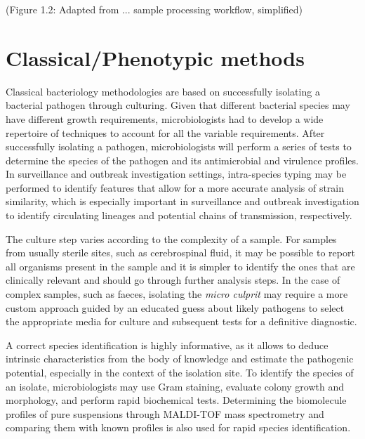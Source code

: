 (Figure 1.2: Adapted from ... sample processing workflow, simplified)

\section{Classical/Phenotypic methods}

Classical bacteriology methodologies are based on successfully isolating a bacterial pathogen through culturing. Given that different bacterial species may have different growth requirements, microbiologists had to develop a wide repertoire of techniques to account for all the variable requirements. After successfully isolating a pathogen, microbiologists will perform a series of tests to determine the species of the pathogen and its antimicrobial and virulence profiles. In surveillance and outbreak investigation settings, intra-species typing may be performed to identify features that allow for a more accurate analysis of strain similarity, which is especially important in surveillance and outbreak investigation to identify circulating lineages and potential chains of transmission, respectively.

The culture step varies according to the complexity of a sample. For samples from usually sterile sites, such as cerebrospinal fluid, it may be possible to report all organisms present in the sample and it is simpler to identify the ones that are clinically relevant and should go through further analysis steps. In the case of complex samples, such as faeces, isolating the \textit{micro culprit} may require a more custom approach guided by an educated guess about likely pathogens to select the appropriate media for culture and subsequent tests for a definitive diagnostic.

A correct species identification is highly informative, as it allows to deduce intrinsic characteristics from the body of knowledge and estimate the pathogenic potential, especially in the context of the isolation site. To identify the species of an isolate, microbiologists may use Gram staining, evaluate colony growth and morphology, and perform rapid biochemical tests. Determining the biomolecule profiles of pure suspensions through \ac{MALDI-TOF} mass spectrometry and comparing them with known profiles is also used for rapid species identification.

